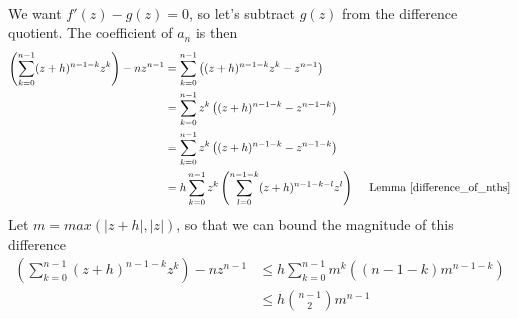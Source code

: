 \documentclass{homework}
\begin{document}
\begin{solution}
\begin{align*}
                                                                                                                                    \end{align*}
                                                                                                                                    We want $f'(z)-g(z)=0$, so let's subtract $g(z)$ from the difference quotient. The coefficient of $a_n$ is then
                                                                                                                                    \begin{align*}
                                                                                                                                    \left(\sum_{k=0}^{n-1}(z+h)^{n-1-k}z^{k}\right) - nz^{n-1} &= \sum_{k=0}^{n-1}\left((z+h)^{n-1-k}z^{k} - z^{n-1} \right)\\
                                                                                                                                    &= \sum_{k=0}^{n-1}z^k\left((z+h)^{n-1-k} - z^{n-1-k} \right)\\
                                                                                                                                    &= \sum_{k=0}^{n-1}z^k\left((z+h)^{n-1-k} - z^{n-1-k} \right)\\
                                                                                                                                    &= h\sum_{k=0}^{n-1}z^k\left(\sum_{l=0}^{n-1-k}(z+h)^{n-1-k-l}z^l\right)\quad \text{ Lemma \eqref{difference_of_nths}}
                                                                                                                                    \end{align*}
                                                                                                                                    Let $m = max(|z+h|, |z|)$, so that we can bound the magnitude of this difference
                                                                                                                                    \begin{align*}
                                                                                                                                    \left(\sum_{k=0}^{n-1}(z+h)^{n-1-k}z^{k}\right) - nz^{n-1} &\leq  h\sum_{k=0}^{n-1}m^k\left((n-1-k)m^{n-1-k}\right)\\
                                                                                                                                    &\leq  h\binom{n-1}{2}m^{n-1}

\end{align*}
\end{solution}
\end{document}
